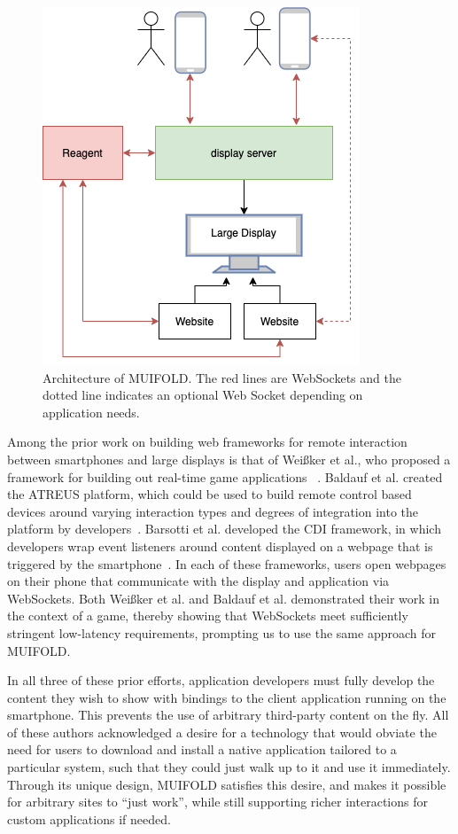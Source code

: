 \begin{figure}
\centering
  \includegraphics[width=0.6\columnwidth]{chapters/03_muifold/figures/muifold_architecture.png}
  \caption{Architecture of MUIFOLD. The red lines are WebSockets and the dotted line indicates an optional Web Socket depending on application needs.}
  \label{fig:architecture_muifold}
\end{figure}

Among the prior work on building web frameworks for remote interaction between smartphones and large displays is that of
Weißker et al., who proposed a
framework for building out real-time game applications ~\cite{weisker_massive_2016}. Baldauf et al. created the ATREUS
platform, which could be used to build remote control based
devices around varying interaction types and degrees of integration
into the platform by developers~\cite{baldauf_your_2016}. Barsotti
et al. developed the CDI framework, in which developers wrap event listeners around content displayed on a webpage
that is triggered by the smartphone~\cite{barsotti_web_2017}.
In each of these frameworks, users open webpages on their phone that communicate with the display and application via WebSockets.
Both Weißker et al. and Baldauf et al. demonstrated their
work in the context of a game, thereby showing that
WebSockets meet sufficiently stringent low-latency requirements, prompting us to use the same approach for MUIFOLD.

In all three of these prior efforts, application
developers must fully develop the content they wish to show with bindings to the client application running on the smartphone. This prevents the use of arbitrary third-party content on the fly.
All of these authors acknowledged a desire for a technology that would obviate the need for users to download and install a native application tailored to a particular system, such that they could just walk up to it and use it immediately. Through its unique design, MUIFOLD satisfies this desire, and makes it possible for arbitrary sites to ``just work'', while still supporting richer interactions for custom applications if needed.
